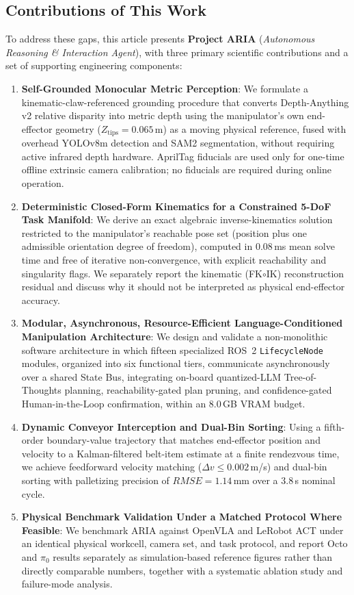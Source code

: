 \documentclass[journal]{IEEEtran}
\begin{document}
\subsection{Contributions of This Work}
To address these gaps, this article presents \textbf{Project ARIA} (\textit{Autonomous Reasoning \& Interaction Agent}), with three primary scientific contributions and a set of supporting engineering components:
\begin{enumerate}
    \item \textbf{Self-Grounded Monocular Metric Perception}: We formulate a kinematic-claw-referenced grounding procedure that converts Depth-Anything v2 relative disparity into metric depth using the manipulator's own end-effector geometry ($Z_{\text{tips}} = 0.065$\,m) as a moving physical reference, fused with overhead YOLOv8m detection and SAM2 segmentation, without requiring active infrared depth hardware. AprilTag fiducials are used only for one-time offline extrinsic camera calibration; no fiducials are required during online operation.
    \item \textbf{Deterministic Closed-Form Kinematics for a Constrained 5-DoF Task Manifold}: We derive an exact algebraic inverse-kinematics solution restricted to the manipulator's reachable pose set (position plus one admissible orientation degree of freedom), computed in $0.08$\,ms mean solve time and free of iterative non-convergence, with explicit reachability and singularity flags. We separately report the kinematic (FK$\circ$IK) reconstruction residual and discuss why it should not be interpreted as physical end-effector accuracy.
    \item \textbf{Modular, Asynchronous, Resource-Efficient Language-Conditioned Manipulation Architecture}: We design and validate a non-monolithic software architecture in which fifteen specialized ROS~2 \texttt{LifecycleNode} modules, organized into six functional tiers, communicate asynchronously over a shared State Bus, integrating on-board quantized-LLM Tree-of-Thoughts planning, reachability-gated plan pruning, and confidence-gated Human-in-the-Loop confirmation, within an 8.0\,GB VRAM budget.
    \item \textbf{Dynamic Conveyor Interception and Dual-Bin Sorting}: Using a fifth-order boundary-value trajectory that matches end-effector position and velocity to a Kalman-filtered belt-item estimate at a finite rendezvous time, we achieve feedforward velocity matching ($\Delta v \le 0.002$\,m/s) and dual-bin sorting with palletizing precision of $RMSE = 1.14$\,mm over a $3.8$\,s nominal cycle.
    \item \textbf{Physical Benchmark Validation Under a Matched Protocol Where Feasible}: We benchmark ARIA against OpenVLA and LeRobot ACT under an identical physical workcell, camera set, and task protocol, and report Octo and $\pi_0$ results separately as simulation-based reference figures rather than directly comparable numbers, together with a systematic ablation study and failure-mode analysis.
\end{enumerate}
\end{document}
